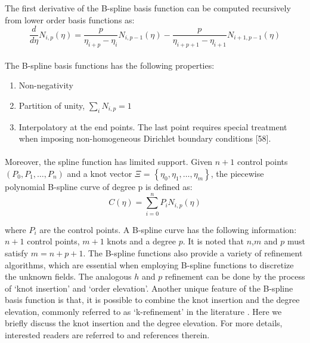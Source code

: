 The first derivative of the B-spline basis function can be computed recursively from lower order basis functions as:
\begin{equation}
    \frac{d}{d\eta} N_{i,p}(\eta) =
        \frac{p}{\eta_{i+p} - \eta_i} N_{i,p-1}(\eta) -
        \frac{p}{\eta_{i+p+1} - \eta_{i+1}} N_{i+1,p-1}(\eta)
\end{equation}

\paragraph{}
The B-spline basis functions has the following properties:
\begin{enumerate}
    \item Non-negativity
    \item Partition of unity, $\sum_i N_{i,p}=1$
    \item Interpolatory at the end points. The last point requires special treatment when imposing non-homogeneous Dirichlet boundary conditions [58].
\end{enumerate}


\paragraph{}
Moreover, the spline function has limited support.
Given $n + 1$ control points $(P_0 ,P_1,\dots,P_n )$ and a knot vector 
    $\Xi$ = $\left\{
        \eta_0 ,\eta_1 ,\dots,\eta_m 
    \right\}$, the piecewise polynomial B-spline curve of degree p is defined as:
\begin{equation}
    C(\eta) = \sum_{i=0}^n P_i N_{i,p} (\eta)
\end{equation}

where $P_i$ are the control points.
A B-spline curve has the following information: $n+1$ control points, $m+1$ knots and a degree $p$.
It is noted that $n$,$m$ and $p$ must satisfy $m = n + p + 1$.
The B-spline functions also provide a variety of refinement algorithms, which are essential when employing B-spline functions to discretize the unknown fields.
The analogous $h$ and $p$ refinement can be done by the process of `knot insertion' and `order elevation'.
Another unique feature of the B-spline basis function is that, it is possible to combine the knot insertion and the degree elevation, commonly referred to as ‘k-refinement’ in the literature \citep{Hug2005b}.
Here we briefly discuss the knot insertion and the degree elevation.
For more details, interested readers are referred to \citep{Pie1997,Hug2005b} and references therein.



